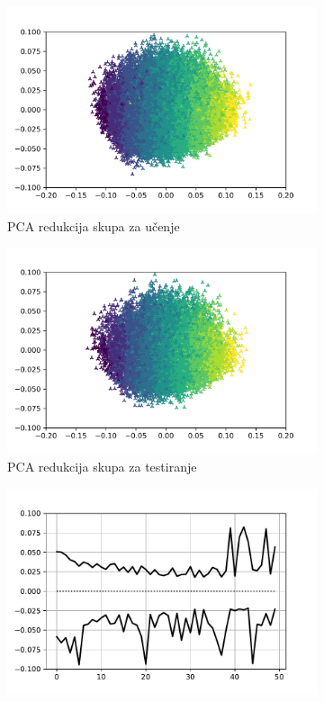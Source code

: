 \documentclass[times, utf8, numeric, diplomski]{fer}
\begin{document}
\begin{figure}[H]
\begin{subfigure}{.5\textwidth}
\includegraphics[width=\textwidth]{ds_nl9_tr_instances.jpg}
\centering
\caption{PCA redukcija skupa za učenje}
\label{fig:dpa4_train_pca}
\end{subfigure}
\begin{subfigure}{.5\textwidth}
\includegraphics[width=\textwidth]{ds_nl9_ts_instances.jpg}
\centering
\caption{PCA redukcija skupa za testiranje}
\label{fig:dpa4_test_pca}
\end{subfigure}
\begin{subfigure}{.5\textwidth}
\includegraphics[width=\textwidth]{ds_nl9_tr_inputs.pdf}

\end{subfigure}
\end{figure}
\end{document}
